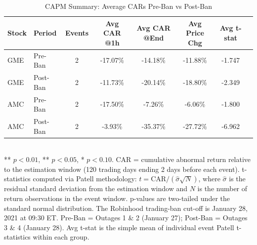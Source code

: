 \begin{table}[htbp]
  \centering
  \caption{CAPM Summary: Average CARs Pre-Ban vs Post-Ban}
  \label{tab:capm_summary}
  \begin{tabular}{llcccccc}
    \hline\hline
    Stock & Period & Events & Avg CAR @1h & Avg CAR @End & Avg Price Chg & Avg t-stat \\
    \hline
    GME & Pre-Ban & 2 & -17.07\% & -14.18\% & -11.88\% & -1.747 \\
    GME & Post-Ban & 2 & -11.73\% & -20.14\% & -18.80\% & -2.349 \\
    \hline
    AMC & Pre-Ban & 2 & -17.50\% & -7.26\% & -6.06\% & -1.800 \\
    AMC & Post-Ban & 2 & -3.93\% & -35.37\% & -27.72\% & -6.962 \\
    \hline\hline
  \end{tabular}
  \\[4pt]
  {\small *** $p<0.01$, ** $p<0.05$, * $p<0.10$. CAR = cumulative abnormal return relative to the estimation window (120 trading days ending 2 days before each event). t-statistics computed via Patell methodology: $t = \text{CAR} / (\hat{\sigma} \sqrt{N})$, where $\hat{\sigma}$ is the residual standard deviation from the estimation window and $N$ is the number of return observations in the event window. p-values are two-tailed under the standard normal distribution. The Robinhood trading-ban cut-off is January 28, 2021 at 09:30 ET. Pre-Ban = Outages 1 \& 2 (January 27); Post-Ban = Outages 3 \& 4 (January 28). Avg t-stat is the simple mean of individual event Patell t-statistics within each group.}
\end{table}
